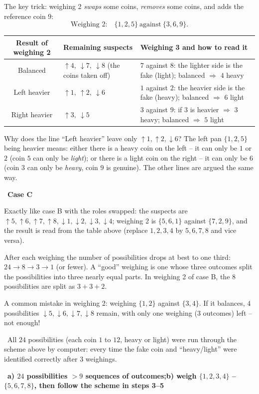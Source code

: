 \documentclass[11pt]{article}
\providecommand{\AnsWord}{Đáp số}
\newcommand{\ans}[1]{\par\smallskip{\bfseries\color{tmGreen!88!black}\AnsWord:}\ {\bfseries\color{AnsRed}#1}\par}
\newcommand{\step}[2]{\par\smallskip\noindent{\bfseries\color{tmBlue!85!black}\StepWord~#1.}\ {\bfseries #2}\par\nopagebreak}
\newcommand{\verify}[1]{\par\smallskip\noindent{\bfseries\color{tmGreen!80!black}\faCheckCircle\ \CheckWord}\ #1\par}
\def\AnsWord{Answer}
\def\StepWord{Step}
\def\CheckWord{Check:}
\begin{document}
{The key trick: weighing 2 \emph{swaps} some coins, \emph{removes} some coins, and adds the reference coin $9$:
\[ \text{Weighing 2:}\quad \{1, 2, 5\} \ \text{against}\ \{3, 6, 9\}. \]
\begin{center}\footnotesize
\begin{tabular}{|c|p{3.6cm}|p{6.4cm}|}
\hline
\rowcolor{tmBlue!10} Result of weighing 2 & Remaining suspects & Weighing 3 and how to read it\\ \hline
Balanced & $\uparrow 4,\ \downarrow 7,\ \downarrow 8$ (the coins taken off) & $7$ against $8$: the lighter side is the fake (light);
balanced $\Rightarrow$ $4$ heavy\\ \hline
Left heavier & $\uparrow 1,\ \uparrow 2,\ \downarrow 6$ & $1$ against $2$: the heavier side is the fake (heavy); balanced
$\Rightarrow$ $6$ light\\ \hline
Right heavier & $\uparrow 3,\ \downarrow 5$ & $3$ against $9$: if $3$ is heavier $\Rightarrow$ $3$ heavy; balanced
$\Rightarrow$ $5$ light\\ \hline
\end{tabular}
\end{center}
\begin{proofbox}Why does the line ``Left heavier'' leave only $\uparrow 1, \uparrow 2, \downarrow 6$? The left pan $\{1, 2, 5\}$ being
heavier means: either there is a heavy coin on the left -- it can only be $1$ or $2$ (coin $5$ can only be \emph{light}); or there is a
light coin on the right -- it can only be $6$ (coin $3$ can only be \emph{heavy}, coin $9$ is genuine). The other lines are argued the
same way.\end{proofbox}
\step{5}{Case C}
Exactly like case B with the roles swapped: the suspects are $\uparrow 5, \uparrow 6, \uparrow 7, \uparrow 8, \downarrow 1,
\downarrow 2, \downarrow 3, \downarrow 4$; weighing 2 is $\{5, 6, 1\}$ against $\{7, 2, 9\}$, and the result is read from the table above
(replace $1, 2, 3, 4$ by $5, 6, 7, 8$ and vice versa).
\begin{tipbox}After each weighing the number of possibilities drops at best to one third: $24 \to 8 \to 3 \to 1$ (or fewer). A ``good''
weighing is one whose three outcomes split the possibilities into three nearly equal parts. In weighing 2 of case B, the $8$
possibilities are split as $3 + 3 + 2$.\end{tipbox}
\begin{warnbox}A common mistake in weighing 2: weighing $\{1, 2\}$ against $\{3, 4\}$. If it balances, $4$ possibilities
$\downarrow 5, \downarrow 6, \downarrow 7, \downarrow 8$ remain, with only one weighing ($3$ outcomes) left -- not enough!\end{warnbox}
\verify{All $24$ possibilities (each coin $1$ to $12$, heavy or light) were run through the scheme above by computer: every time the
fake coin and ``heavy/light'' were identified correctly after $3$ weighings.}
\ans{a) $24$ possibilities $> 9$ sequences of outcomes;\quad b) weigh $\{1,2,3,4\}$ -- $\{5,6,7,8\}$, then follow the scheme in steps 3--5}
}
\end{document}
